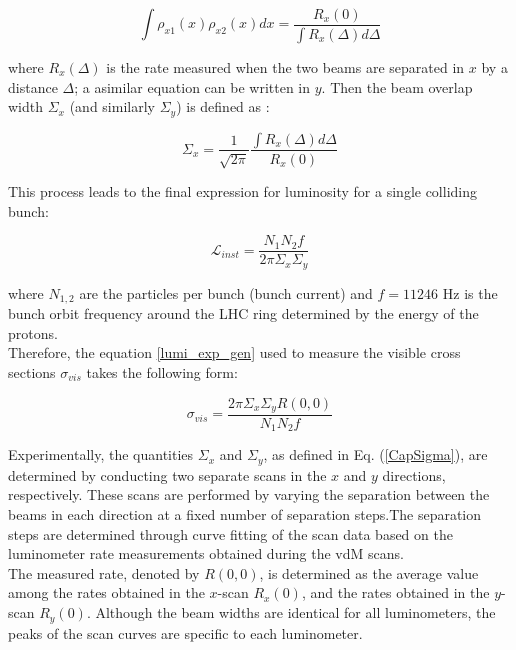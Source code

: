 \begin{equation}
\int \rho_{x1}(x) \rho_{x2}(x) dx = \frac{R_{x}(0)}{\int R_{x}(\Delta) d\Delta}
\end{equation}

where $R_{x}(\Delta)$ is the rate measured when the two beams are separated in $x$ by a distance $\Delta$; a asimilar equation can be written in $y$. Then the beam overlap width $\Sigma_{x}$ (and similarly $\Sigma_{y}$) is defined as \cite{pas_18}:

\begin{equation}
\Sigma_{x}= \frac{1}{\sqrt{2\pi}} \frac{\int R_{x}(\Delta)d\Delta}{R_{x}(0)}
\label{CapSigma}
\end{equation}

This process leads to the final expression for luminosity for a single colliding bunch:

\begin{equation}
\mathcal{L}_{inst}=\frac{N_{1} N_{2}f}{2 \pi \Sigma_{x}\Sigma_{y}}
\end{equation}

where $N_{1,2}$ are the particles per bunch (bunch current) and  $f= 11246$ Hz is the bunch orbit frequency around the LHC ring determined by the energy of the protons.\\

Therefore, the equation \ref{lumi_exp_gen} used to measure the visible cross sections $\sigma_{vis}$ takes the following form:

\begin{equation}
  \sigma_{vis}=\frac{2\pi \Sigma_{x} \Sigma_{y} R(0, 0)}{N_{1}N_{2} f}
  \label{sigmavis_eq}
\end{equation}

Experimentally, the quantities $\Sigma_{x}$ and $\Sigma_{y}$, as defined in Eq. (\ref{CapSigma}), are determined by conducting two separate scans in the $x$ and $y$ directions, respectively. 
These scans are performed by varying the separation between the beams in each direction  at a fixed number of separation steps.The separation steps are determined through curve fitting of the scan data based on the luminometer rate measurements obtained during the vdM scans.\\

The measured rate, denoted by $R(0,0)$, is determined as the average value among the rates obtained in the $x$-scan $R_x(0)$, and the rates obtained in the $y$-scan $R_y(0)$. Although the beam widths are identical for all luminometers, the peaks of the scan curves are specific to each luminometer.\\

